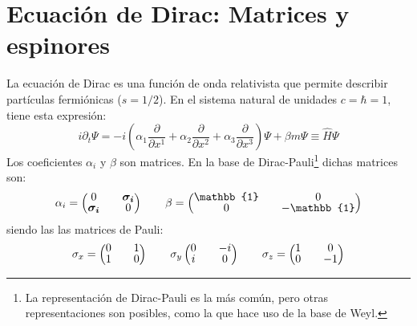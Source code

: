 \section{Ecuación de Dirac: Matrices y espinores}\label{sec:Dirac}
La ecuación de Dirac es una función de onda relativista que permite describir partículas fermiónicas ($s=1/2$). En el sistema natural de unidades $c=\hbar =1$, tiene esta expresión:
\begin{equation}
i\partial _{t}\Psi = -i\left( \alpha _{1}\dfrac{\partial }{\partial x^{1}}+\alpha _{2}\dfrac{\partial }{\partial x^{2}} + \alpha _{3}\dfrac{\partial }{\partial x^{3}}\right) \Psi +\beta m\Psi \equiv\widehat{H}\Psi \label{eq:Dirac}
\end{equation}
Los coeficientes $\alpha_i$ y $\beta$ son matrices. En la base de Dirac-Pauli\footnote{La representación de Dirac-Pauli es la más común, pero otras representaciones son posibles, como la que hace uso de la base de Weyl.} dichas matrices son:
\begin{align*}
\alpha _{i}=
\begingroup 
\renewcommand*{\arraystretch}{0.8}
\setlength\arraycolsep{10pt}
\begin{pmatrix} 
0 & \boldsymbol{\sigma_{i}} \\ \boldsymbol{\sigma_{i}} & 0 \end{pmatrix} \qquad
\beta =\begin{pmatrix} \mathbb{1} & 0 \\ 0 & -\mathbb{1} \end{pmatrix}
\endgroup
\end{align*}
siendo las  las matrices de Pauli:
\begin{align*}
\sigma _{x}=
\begingroup 
\renewcommand*{\arraystretch}{0.8}
\setlength\arraycolsep{10pt}
\begin{pmatrix} 
0 & 1 \\ 1 & 0 \end{pmatrix} \qquad \sigma_y
\begin{pmatrix} 
0 & -i \\ i & 0 \end{pmatrix} \qquad
\sigma_z =\begin{pmatrix} 1 & 0 \\ 0 & -1 \end{pmatrix}
\endgroup
\end{align*}

